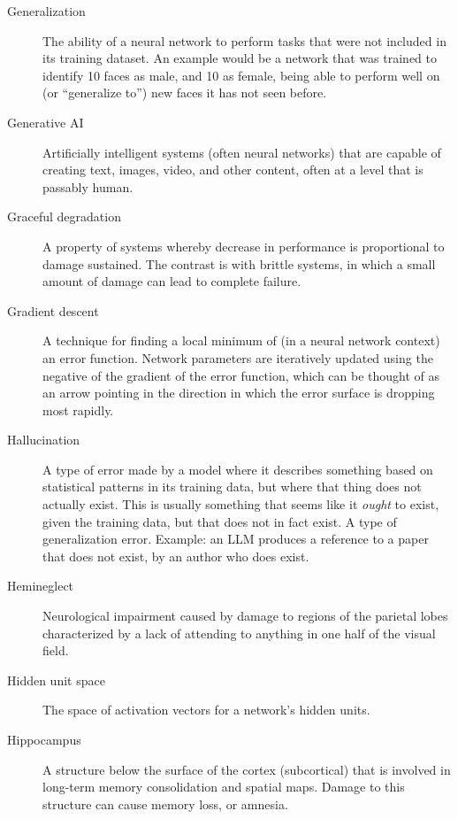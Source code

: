 \begin{description}
\item[Generalization] The ability of a neural network to perform tasks that were not included in its training dataset. An example would be a network that was trained to identify 10 faces as male, and 10 as female, being able to perform well on (or ``generalize to'') new faces it has not seen before.

\item[Generative AI] Artificially intelligent systems (often neural networks) that are capable of creating text, images, video, and other content, often at a level that is passably human.

\item[Graceful degradation] A property of systems whereby decrease in performance is proportional to damage sustained. The contrast is with brittle systems, in which a small amount of damage can lead to complete failure.

\item[Gradient descent] A technique for finding a local minimum of (in a neural network context) an error function. Network parameters are iteratively updated using the negative of the gradient of the error function, which can be thought of as an arrow pointing in the direction in which the error surface is dropping most rapidly.

\item[Hallucination] A type of error made by a model where it describes something based on statistical patterns in its training data, but where that thing does not actually exist. This is usually something that seems like it \emph{ought} to exist, given the training data, but that does not in fact exist. A type of generalization error. Example: an LLM produces a reference to a paper that does not exist, by an author who does exist.

\item[Hemineglect] Neurological impairment caused by damage to regions of the parietal lobes characterized by a lack of attending to anything in one half of the visual field.

\item[Hidden unit space] The space of activation vectors for a network's hidden units.

\item[Hippocampus] A structure below the surface of the cortex (subcortical) that is involved in long-term memory consolidation and spatial maps. Damage to this structure can cause memory loss, or amnesia. 



\end{description}
